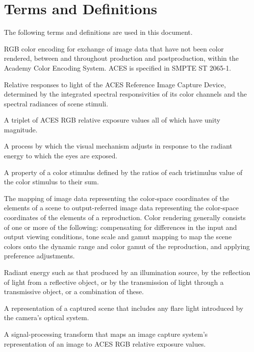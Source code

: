 \numberedformat
\chapter{Terms and Definitions}
The following terms and definitions are used in this document.

RGB color encoding for exchange of image data that have not been color rendered, between and throughout production and postproduction, within the Academy Color Encoding System. ACES is specified in SMPTE ST 2065-1.

Relative responses to light of the ACES Reference Image Capture Device, determined by the integrated spectral responsivities of its color channels and the spectral radiances of scene stimuli.

A triplet of ACES RGB relative exposure values all of which have unity magnitude.

A process by which the visual mechanism adjusts in response to the radiant energy to which the eyes are exposed.

A property of a color stimulus defined by the ratios of each tristimulus value of the color stimulus to their sum.

The mapping of image data representing the color-space coordinates of the elements of a scene to output-referred image data representing the color-space coordinates of the elements of a reproduction. Color rendering generally consists of one or more of the following: compensating for differences in the input and output viewing conditions, tone scale and gamut mapping to map the scene colors onto the dynamic range and color gamut of the reproduction, and applying preference adjustments.

Radiant energy such as that produced by an illumination source, by the reflection of light from a reflective object, or by the transmission of light through a transmissive object, or a combination of these.

A representation of a captured scene that includes any flare light introduced by the camera’s optical system.

A signal-processing transform that maps an image capture system’s representation of an image to ACES RGB relative exposure values.

